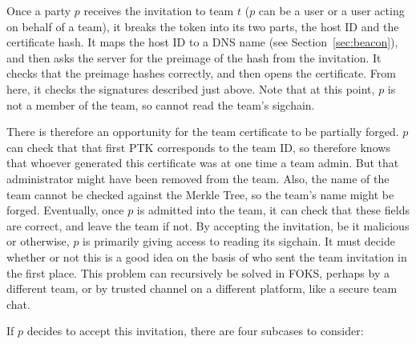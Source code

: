 Once a party $p$ receives the invitation to team $t$ ($p$ can be a user or a
user acting on behalf of a team), it breaks the token into its two parts, the
host ID and the certificate hash. It maps the host ID to a DNS name (see
Section~\ref{sec:beacon}), and then asks the server for the preimage of the hash
from the invitation. It checks that the preimage hashes correctly, and then
opens the certificate. From here, it checks the signatures described just above.
Note that at this point, $p$ is not a member of the team, so cannot read the
team's sigchain. 

There is therefore an opportunity for the team certificate to be partially
forged. $p$ can check that that first PTK corresponds to the team ID, so
therefore knows that whoever generated this certificate was at one time a team
admin.  But that administrator might have been removed from the team. Also, the
name of the team cannot be checked against the Merkle Tree, so the team's name
might be forged. Eventually, once $p$ is admitted into the team, it can check
that these fields are correct, and leave the team if not.  By accepting the
invitation, be it malicious or otherwise, $p$ is primarily giving access to
reading its sigchain. It must decide whether or not this is a good idea on the
basis of who sent the team invitation in the first place. This problem can
recursively be solved in FOKS, perhaps by a different team, or by trusted
channel on a different platform, like a secure team chat.

If $p$ decides to accept this invitation, there are four subcases to consider:

